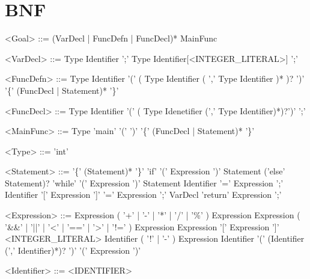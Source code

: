 \documentclass{ctexart}
\newenvironment{typewriterfont}{\ttfamily}{\par}
\begin{document}
\newpage
\section{BNF}
\setlength{\grammarindent}{8em} %
\begin{typewriterfont}
\begin{grammar}
<Goal> ::= (VarDecl | FuncDefn | FuncDecl)* MainFunc

<VarDecl> ::= Type Identifier ';'
\alt Type Identifier[<INTEGER\_LITERAL>] ';'

<FuncDefn>  ::= Type Identifier '(' ( Type Identifier ( ',' Type Identifier )* )? ')' '\{' (FuncDecl | Statement)* '\}'

<FuncDecl> ::= Type Identifier '(' ( Type Idenetifier (',' Type Identifier)*)?')' ';'

<MainFunc> ::= Type 'main' '(' ')' '\{' (FuncDecl | Statement)* '\}'

<Type> ::= 'int'

<Statement> ::= '\{' (Statement)* '\}'
\alt 'if' '(' Expression ')' Statement ('else' Statement)?
\alt 'while' '(' Expression ')' Statement
\alt Identifier '=' Expression ';'
\alt Identifier '[' Expression ']' '=' Expression ';'
\alt VarDecl
\alt 'return' Expression ';'

<Expression>	::=	Expression ( '+' | '-' | '*' | '/' | '\%' ) Expression
\alt Expression ( '\&\&' | '||' | '\textless' | '==' | '\textgreater' | '!=' ) Expression
\alt Expression '[' Expression ']'
\alt <INTEGER\_LITERAL>
\alt Identifier
\alt ( '!' | '-' ) Expression
\alt Identifier '(' (Identifier (',' Identifier)*)? ')'
\alt '(' Expression ')'

<Identifier>	::=	<IDENTIFIER>

\end{grammar}
\end{typewriterfont}

\newpage
\end{document}
